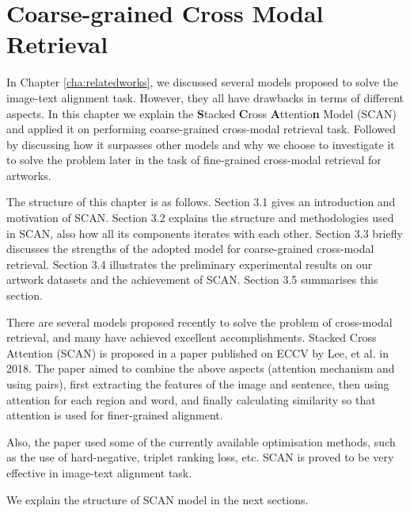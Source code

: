 \chapter{Coarse-grained Cross Modal Retrieval}
\label{cha:scan}
In Chapter \ref{cha:relatedworks}, we discussed several models proposed to solve the image-text alignment task. However, they all have drawbacks in terms of different aspects. In this chapter we explain the \textbf{S}tacked \textbf{C}ross \textbf{A}ttentio\textbf{n} Model (SCAN) \cite{scan} and applied it on performing coarse-grained cross-modal retrieval task. Followed by discussing how it surpasses other models and why we choose to investigate it to solve the problem later in the task of fine-grained cross-modal retrieval for artworks.

The structure of this chapter is as follows. Section 3.1 gives an introduction and motivation of SCAN. Section 3.2 explains the structure and methodologies used in SCAN, also how all its components iterates with each other. Section 3.3 briefly discusses the strengths of the adopted model for coarse-grained cross-modal retrieval. Section 3.4 illustrates the preliminary experimental results on our artwork datasets and the achievement of SCAN. Section 3.5 summarises this section.



There are several models proposed recently to solve the problem of cross-modal retrieval, and many have achieved excellent accomplishments. Stacked Cross Attention (SCAN) is proposed in a paper published on ECCV by Lee, et al. \cite{scan} in 2018. The paper aimed to combine the above aspects (attention mechanism and using pairs), first extracting the features of the image and sentence, then using attention for each region and word, and finally calculating similarity so that attention is used for finer-grained alignment.

Also, the paper used some of the currently available optimisation methods, such as the use of hard-negative, triplet ranking loss, etc. SCAN is proved to be very effective in image-text alignment task.

We explain the structure of SCAN model in the next sections.

